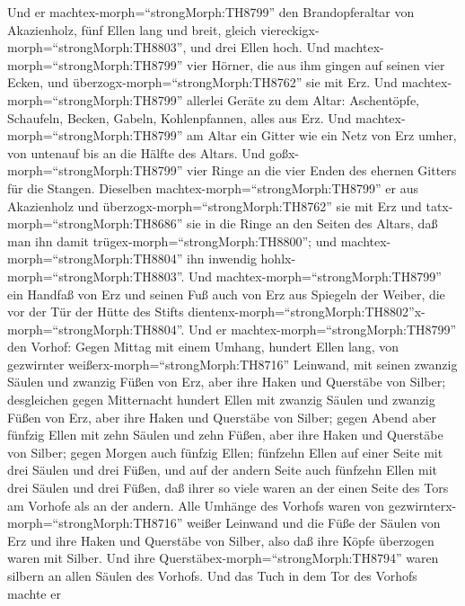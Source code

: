  Und er machtex-morph=``strongMorph:TH8799'' den
Brandopferaltar von Akazienholz, fünf Ellen lang und breit, gleich
viereckigx-morph=``strongMorph:TH8803'', und drei Ellen hoch.
 Und machtex-morph=``strongMorph:TH8799'' vier Hörner, die
aus ihm gingen auf seinen vier Ecken, und
überzogx-morph=``strongMorph:TH8762'' sie mit Erz.  Und
machtex-morph=``strongMorph:TH8799'' allerlei Geräte zu dem Altar:
Aschentöpfe, Schaufeln, Becken, Gabeln, Kohlenpfannen, alles aus Erz.
 Und machtex-morph=``strongMorph:TH8799'' am Altar ein
Gitter wie ein Netz von Erz umher, von untenauf bis an die Hälfte des
Altars.  Und goßx-morph=``strongMorph:TH8799'' vier Ringe an
die vier Enden des ehernen Gitters für die Stangen. 
Dieselben machtex-morph=``strongMorph:TH8799'' er aus Akazienholz und
überzogx-morph=``strongMorph:TH8762'' sie mit Erz  und
tatx-morph=``strongMorph:TH8686'' sie in die Ringe an den Seiten des
Altars, daß man ihn damit trügex-morph=``strongMorph:TH8800''; und
machtex-morph=``strongMorph:TH8804'' ihn inwendig
hohlx-morph=``strongMorph:TH8803''.  Und
machtex-morph=``strongMorph:TH8799'' ein Handfaß von Erz und seinen Fuß
auch von Erz aus Spiegeln der Weiber, die vor der Tür der Hütte des
Stifts
dientenx-morph=``strongMorph:TH8802''x-morph=``strongMorph:TH8804''.
 Und er machtex-morph=``strongMorph:TH8799'' den Vorhof:
Gegen Mittag mit einem Umhang, hundert Ellen lang, von gezwirnter
weißerx-morph=``strongMorph:TH8716'' Leinwand,  mit seinen
zwanzig Säulen und zwanzig Füßen von Erz, aber ihre Haken und Querstäbe
von Silber;  desgleichen gegen Mitternacht hundert Ellen
mit zwanzig Säulen und zwanzig Füßen von Erz, aber ihre Haken und
Querstäbe von Silber;  gegen Abend aber fünfzig Ellen mit
zehn Säulen und zehn Füßen, aber ihre Haken und Querstäbe von Silber;
 gegen Morgen auch fünfzig Ellen;  fünfzehn
Ellen auf einer Seite mit drei Säulen und drei Füßen,  und
auf der andern Seite auch fünfzehn Ellen mit drei Säulen und drei Füßen,
daß ihrer so viele waren an der einen Seite des Tors am Vorhofe als an
der andern.  Alle Umhänge des Vorhofs waren von
gezwirnterx-morph=``strongMorph:TH8716'' weißer Leinwand 
und die Füße der Säulen von Erz und ihre Haken und Querstäbe von Silber,
also daß ihre Köpfe überzogen waren mit Silber. Und ihre
Querstäbex-morph=``strongMorph:TH8794'' waren silbern an allen Säulen
des Vorhofs.  Und das Tuch in dem Tor des Vorhofs machte er
